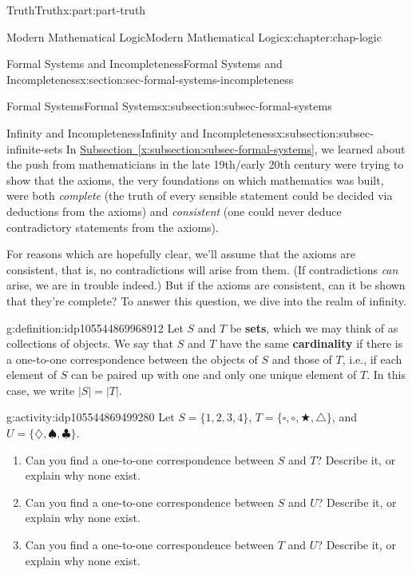 \documentclass[oneside,10pt,]{book}
\newcommand{\xreffont}{\relax}
\newcommand{\terminology}[1]{\textbf{#1}}
\numberwithin{equation}{section}
\begin{document}
\begin{partptx}{Truth}{}{Truth}{}{}{x:part:part-truth}
\begin{chapterptx}{Modern Mathematical Logic}{}{Modern Mathematical Logic}{}{}{x:chapter:chap-logic}
\begin{sectionptx}{Formal Systems and Incompleteness}{}{Formal Systems and Incompleteness}{}{}{x:section:sec-formal-systems-incompleteness}
\begin{subsectionptx}{Formal Systems}{}{Formal Systems}{}{}{x:subsection:subsec-formal-systems}
\end{subsectionptx}
%
%
\typeout{************************************************}
\typeout{************************************************}
%
\begin{subsectionptx}{Infinity and Incompleteness}{}{Infinity and Incompleteness}{}{}{x:subsection:subsec-infinite-sets}
In \hyperref[x:subsection:subsec-formal-systems]{Subsection~{\xreffont\ref{x:subsection:subsec-formal-systems}}}, we learned about the push from mathematicians in the late 19th\slash{}early 20th century were trying to show that the axioms, the very foundations on which mathematics was built, were both \emph{complete} (the truth of every sensible statement could be decided via deductions from the axioms) and \emph{consistent} (one could never deduce contradictory statements from the axioms).%
\par
For reasons which are hopefully clear, we'll assume that the axioms are consistent, that is, no contradictions will arise from them. (If contradictions \emph{can} arise, we are in trouble indeed.) But if the axioms are consistent, can it be shown that they're complete? To answer this question, we dive into the realm of infinity.%
\begin{definition}{}{g:definition:idp105544869968912}%
Let \(S\) and \(T\) be \terminology{sets}, which we may think of as collections of objects. We say that \(S\) and \(T\) have the same \terminology{cardinality} if there is a one-to-one correspondence between the objects of \(S\) and those of \(T\), i.e., if each element of \(S\) can be paired up with one and only one unique element of \(T\). In this case, we write \(|S| = |T|\).%
\end{definition}
\begin{activity}{}{g:activity:idp105544869499280}%
Let \(S = \{1,2,3,4\}\), \(T=\{\square,\circ,\bigstar,\triangle\}\), and \(U = \{\diamondsuit,\spadesuit,\clubsuit\}\).%
%
\begin{enumerate}
\item{}Can you find a one-to-one correspondence between \(S\) and \(T\)? Describe it, or explain why none exist.%
\item{}Can you find a one-to-one correspondence between \(S\) and \(U\)? Describe it, or explain why none exist.%
\item{}Can you find a one-to-one correspondence between \(T\) and \(U\)? Describe it, or explain why none exist.%
\end{enumerate}
\end{activity}%

\end{subsectionptx}
\end{sectionptx}
\end{chapterptx}
\end{partptx}
\end{document}
